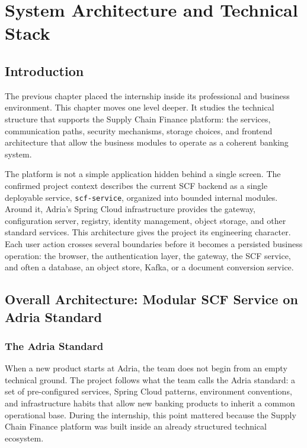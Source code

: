 \chapter{System Architecture and Technical Stack}
\label{chap:system_architecture}

\section{Introduction}
\label{sec:ch2_introduction}

The previous chapter placed the internship inside its professional and business environment. This chapter moves one level deeper. It studies the technical structure that supports the Supply Chain Finance platform: the services, communication paths, security mechanisms, storage choices, and frontend architecture that allow the business modules to operate as a coherent banking system.

The platform is not a simple application hidden behind a single screen. The confirmed project context describes the current SCF backend as a single deployable service, \texttt{scf-service}, organized into bounded internal modules. Around it, Adria's Spring Cloud infrastructure provides the gateway, configuration server, registry, identity management, object storage, and other standard services. This architecture gives the project its engineering character. Each user action crosses several boundaries before it becomes a persisted business operation: the browser, the authentication layer, the gateway, the SCF service, and often a database, an object store, Kafka, or a document conversion service.

\section{Overall Architecture: Modular SCF Service on Adria Standard}
\label{sec:overall_architecture}

\subsection{The Adria Standard}
\label{subsec:adria_standard}

When a new product starts at Adria, the team does not begin from an empty technical ground. The project follows what the team calls the Adria standard: a set of pre-configured services, Spring Cloud patterns, environment conventions, and infrastructure habits that allow new banking products to inherit a common operational base. During the internship, this point mattered because the Supply Chain Finance platform was built inside an already structured technical ecosystem.

